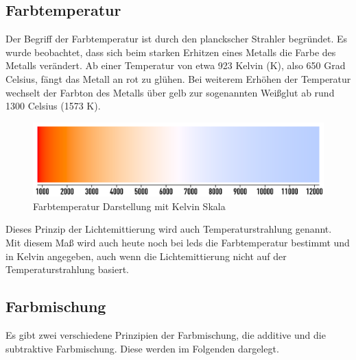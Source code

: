 \documentclass[11pt]{scrartcl}
\begin{document}
\subsection{Farbtemperatur}
Der Begriff der Farbtemperatur ist durch den planckscher Strahler begründet. Es wurde beobachtet, dass sich beim starken Erhitzen eines Metalls
die Farbe des Metalls verändert. Ab einer Temperatur von etwa 923 Kelvin (K), also 650 Grad Celsius, fängt das Metall an rot zu glühen. Bei
weiterem Erhöhen der Temperatur wechselt der Farbton des Metalls über gelb zur sogenannten Weißglut ab rund 1300 Celsius (1573 K). %
\begin{figure}[H]
    \begin{center}
        \includegraphics[width=.8\textwidth]{images/thermal_radiation_figure.png}
    \end{center}
    \caption{Farbtemperatur Darstellung mit Kelvin Skala \cite{wikiFarbtemperatur}}
\end{figure}
\noindent
Dieses Prinzip der Lichtemittierung wird auch Temperaturstrahlung genannt.\\
Mit diesem Maß wird auch heute noch bei \ac{led}s die Farbtemperatur bestimmt und in Kelvin angegeben, auch wenn die Lichtemittierung nicht auf der
Temperaturstrahlung basiert.
\subsection{Farbmischung}
Es gibt zwei verschiedene Prinzipien der Farbmischung, die additive und die subtraktive Farbmischung. Diese werden im Folgenden dargelegt.
\end{document}
